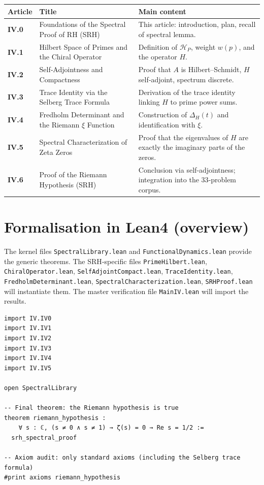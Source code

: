 \documentclass[11pt,a4paper]{article}
\begin{document}
\begin{center}
\small
\begin{tabular}{@{}>{\bfseries}l>{\raggedright\arraybackslash}p{4.5cm}>{\raggedright\arraybackslash}p{6cm}@{}}
\toprule
\textbf{Article} & \textbf{Title} & \textbf{Main content} \\
\midrule
IV.0 & Foundations of the Spectral Proof of RH (SRH) & This article: introduction, plan, recall of spectral lemma. \\
IV.1 & Hilbert Space of Primes and the Chiral Operator & Definition of $\mathcal{H}_P$, weight $w(p)$, and the operator $H$. \\
IV.2 & Self‑Adjointness and Compactness & Proof that $A$ is Hilbert–Schmidt, $H$ self‑adjoint, spectrum discrete. \\
IV.3 & Trace Identity via the Selberg Trace Formula & Derivation of the trace identity linking $H$ to prime power sums. \\
IV.4 & Fredholm Determinant and the Riemann $\xi$ Function & Construction of $\Delta_H(t)$ and identification with $\xi$. \\
IV.5 & Spectral Characterization of Zeta Zeros & Proof that the eigenvalues of $H$ are exactly the imaginary parts of the zeros. \\
IV.6 & Proof of the Riemann Hypothesis (SRH) & Conclusion via self‑adjointness; integration into the 33‑problem corpus. \\
\bottomrule
\end{tabular}
\end{center}

\section{Formalisation in Lean4 (overview)}

The kernel files \texttt{SpectralLibrary.lean} and \texttt{FunctionalDynamics.lean} provide the generic theorems. The SRH‑specific files \texttt{PrimeHilbert.lean}, \texttt{ChiralOperator.lean}, \texttt{SelfAdjointCompact.lean}, \texttt{TraceIdentity.lean}, \texttt{FredholmDeterminant.lean}, \texttt{SpectralCharacterization.lean}, \texttt{SRHProof.lean} will instantiate them. The master verification file \texttt{MainIV.lean} will import the results.

\begin{lstlisting}[style=lean, caption={MainIV.lean (sketch)}]
import IV.IV0
import IV.IV1
import IV.IV2
import IV.IV3
import IV.IV4
import IV.IV5

open SpectralLibrary

-- Final theorem: the Riemann hypothesis is true
theorem riemann_hypothesis :
    ∀ s : ℂ, (s ≠ 0 ∧ s ≠ 1) → ζ(s) = 0 → Re s = 1/2 :=
  srh_spectral_proof

-- Axiom audit: only standard axioms (including the Selberg trace formula)
#print axioms riemann_hypothesis
\end{lstlisting}
\end{document}
